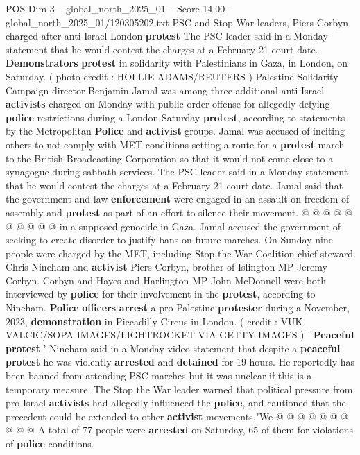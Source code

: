 \begin{textsample}{POS Dim 3 – global\_north\_2025\_01 – Score 14.00 – global\_north\_2025\_01/120305202.txt}  \label{ex:f3_pos_264}
PSC and Stop War leaders, Piers Corbyn charged after anti-Israel London \textbf{protest} The PSC leader said in a Monday statement that he would contest the charges at a February 21 court date. \textbf{Demonstrators} \textbf{protest} in solidarity with Palestinians in Gaza, in London, on Saturday. ( photo credit : HOLLIE ADAMS/REUTERS ) Palestine Solidarity Campaign director Benjamin Jamal was among three additional anti-Israel \textbf{activists} charged on Monday with public order offense for allegedly defying \textbf{police} restrictions during a London Saturday \textbf{protest}, according to statements by the Metropolitan \textbf{Police} and \textbf{activist} groups.
Jamal was accused of inciting others to not comply with MET conditions setting a route for a \textbf{protest} march to the British Broadcasting Corporation so that it would not come close to a synagogue during sabbath services.
The PSC leader said in a Monday statement that he would contest the charges at a February 21 court date.
Jamal said that the government and law \textbf{enforcement} were engaged in an assault on freedom of assembly and \textbf{protest} as part of an effort to silence their movement. @ @ @ @ @ @ @ @ @ @ in a supposed genocide in Gaza.
Jamal accused the government of seeking to create disorder to justify bans on future marches.
On Sunday nine people were charged by the MET, including Stop the War Coalition chief steward Chris Nineham and \textbf{activist} Piers Corbyn, brother of Islington MP Jeremy Corbyn.
Corbyn and Hayes and Harlington MP John McDonnell were both interviewed by \textbf{police} for their involvement in the \textbf{protest}, according to Nineham. \textbf{Police} \textbf{officers} \textbf{arrest} a pro-Palestine \textbf{protester} during a November, 2023, \textbf{demonstration} in Piccadilly Circus in London. ( credit : VUK VALCIC/SOPA IMAGES/LIGHTROCKET VIA GETTY IMAGES ) ' \textbf{Peaceful} \textbf{protest} ' Nineham said in a Monday video statement that despite a \textbf{peaceful} \textbf{protest} he was violently \textbf{arrested} and \textbf{detained} for 19 hours.
He reportedly has been banned from attending PSC marches but it was unclear if this is a temporary measure.
The Stop the War leader warned that political pressure from pro-Israel \textbf{activists} had allegedly influenced the \textbf{police}, and cautioned that the precedent could be extended to other \textbf{activist} movements."We @ @ @ @ @ @ @ @ @ @ A total of 77 people were \textbf{arrested} on Saturday, 65 of them for violations of \textbf{police} conditions.

\end{textsample}

